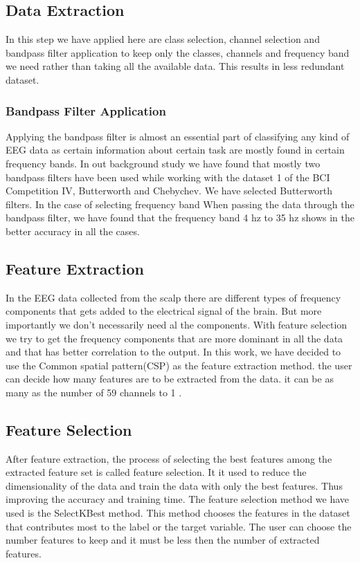 \documentclass[12pt,a4paper]{report}
\begin{document}
\subsection{Data Extraction}
\justify In this step we have applied here are class selection, channel selection and bandpass filter application to keep only the classes, channels and frequency band we need rather than taking all the available data. This results in less redundant dataset.

\subsubsection{Bandpass Filter Application}
\justify Applying the bandpass filter is almost an essential part of classifying any kind of EEG data as certain information about certain task are mostly found in certain frequency bands.
\justify In out background study we have found that mostly two bandpass filters have been used while working with the dataset 1 of the BCI Competition IV, Butterworth and Chebychev. We have selected Butterworth filters.
\justify In the case of selecting frequency band When passing the data through the bandpass filter, we have found that the frequency band 4 hz to 35 hz shows in the better accuracy in all the cases.
\subsection{Feature Extraction}
\justify In the EEG data collected from the scalp there are different types of frequency components that gets added to the electrical signal of the brain. But more importantly we don't necessarily need al the components. With feature selection we try to get the frequency components that are more dominant in all the data and that has better correlation to the output.
\justify In this work, we have decided to use the Common spatial pattern(CSP) as the feature extraction method. the user can decide how many features are to be extracted from the data. it can be as many as the number of 59 channels to 1 .
\subsection{Feature Selection}
\justify After feature extraction, the process of selecting the best features among the extracted feature set is called feature selection. It it used to reduce the dimensionality of the data and train the data with only the best features. Thus improving the accuracy and training time.
\justify The feature selection method we have used is the SelectKBest method. This method chooses the features in the dataset that contributes most to the label or the target variable. The user can choose the number features to keep and it must be less then the number of extracted features.
\end{document}
